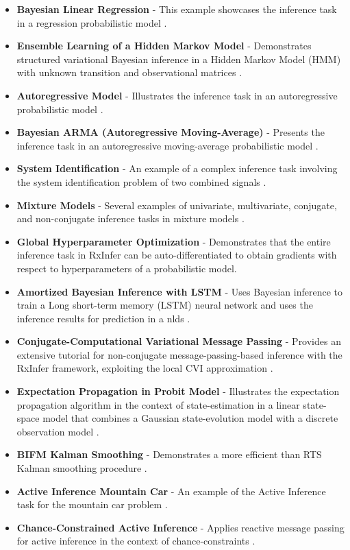 \begin{itemize}
  \item \textbf{Bayesian Linear Regression} - This example showcases the inference task in a regression probabilistic model \citep{wang_general_2015}.
  \item \textbf{Ensemble Learning of a Hidden Markov Model} - Demonstrates structured variational Bayesian inference in a Hidden Markov Model (HMM) with unknown transition and observational matrices \citep{rabiner_tutorial_1989, ephraim_bayesian_1992}.
  \item \textbf{Autoregressive Model} - Illustrates the inference task in an autoregressive probabilistic model \citep{podusenko_message_2021-1}.
  \item \textbf{Bayesian ARMA (Autoregressive Moving-Average)} - Presents the inference task in an autoregressive moving-average probabilistic model \citep{thiesson_arma_2012, kouw_variational_2021}.
  \item \textbf{System Identification} - An example of a complex inference task involving the system identification problem of two combined signals \citep{peterka_bayesian_1981}.
  \item \textbf{Mixture Models} - Several examples of univariate, multivariate, conjugate, and non-conjugate inference tasks in mixture models \citep{podusenko_message_2021, hao_speech_2010}.
  \item \textbf{Global Hyperparameter Optimization} - Demonstrates that the entire inference task in RxInfer can be auto-differentiated to obtain gradients with respect to hyperparameters of a probabilistic model.
  \item \textbf{Amortized Bayesian Inference with LSTM} - Uses Bayesian inference to train a Long short-term memory (LSTM) neural network and uses the inference results for prediction in a \ac{nlds} \citep{gemici_generative_2017}.
  \item \textbf{Conjugate-Computational Variational Message Passing} - Provides an extensive tutorial for non-conjugate message-passing-based inference with the RxInfer framework, exploiting the local CVI approximation \citep{akbayrak_probabilistic_2022}.
  \item \textbf{Expectation Propagation in Probit Model} - Illustrates the expectation propagation algorithm in the context of state-estimation in a linear state-space model that combines a Gaussian state-evolution model with a discrete observation model \citep{raymond_expectation_2014}.
  \item \textbf{BIFM Kalman Smoothing} - Demonstrates a more efficient than RTS Kalman smoothing procedure \citep{wadehn_new_2016, loeliger_sparsity_2016}.
  \item \textbf{Active Inference Mountain Car} - An example of the Active Inference task for the mountain car problem \citep{van_de_laar_simulating_2019}.
  \item \textbf{Chance-Constrained Active Inference} - Applies reactive message passing for active inference in the context of chance-constraints \citep{van_de_laar_chance-constrained_2021}.
\end{itemize}

